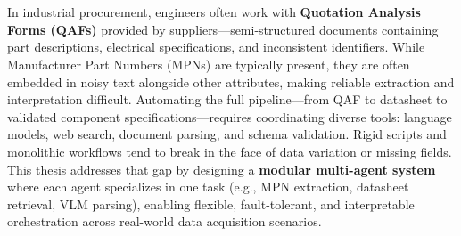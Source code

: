 \chapter{\abstractname}

In industrial procurement, engineers often work with \textbf{Quotation Analysis Forms (QAFs)} provided by suppliers—semi-structured documents containing part descriptions, electrical specifications, and inconsistent identifiers. While Manufacturer Part Numbers (MPNs) are typically present, they are often embedded in noisy text alongside other attributes, making reliable extraction and interpretation difficult. Automating the full pipeline—from QAF to datasheet to validated component specifications—requires coordinating diverse tools: language models, web search, document parsing, and schema validation. Rigid scripts and monolithic workflows tend to break in the face of data variation or missing fields. This thesis addresses that gap by designing a \textbf{modular multi-agent system} where each agent specializes in one task (e.g., MPN extraction, datasheet retrieval, VLM parsing), enabling flexible, fault-tolerant, and interpretable orchestration across real-world data acquisition scenarios.
